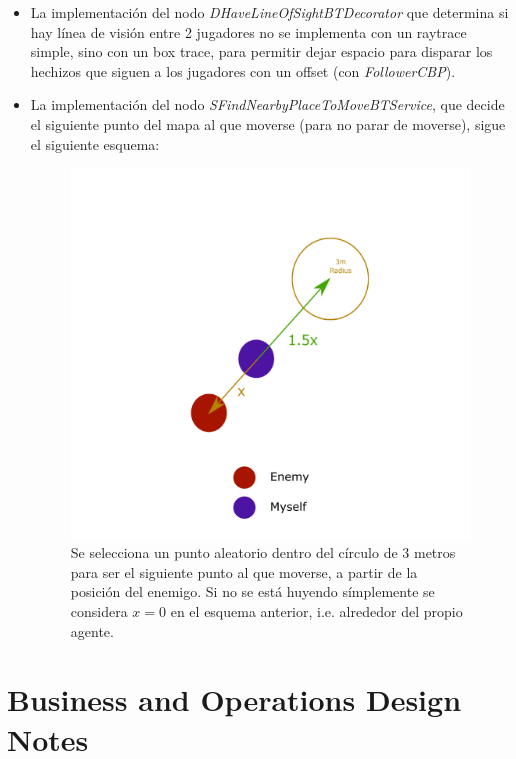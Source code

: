 \documentclass[12pt]{report}
\newcommand*\cleartoleftpage{%
  \clearpage
  \ifodd\value{page}\hbox{}\newpage\fi
}
\begin{document}
\begin{itemize}
	\item La implementación del nodo \textit{\emph{DHaveLineOfSightBTDecorator}} que determina si hay línea de visión entre 2 jugadores no se implementa con un raytrace simple, sino con un box trace, para permitir dejar espacio para disparar los hechizos que siguen a los jugadores con un offset (con \textit{FollowerCBP}).
	\item La implementación del nodo \textit{\emph{SFindNearbyPlaceToMoveBTService}}, que decide el siguiente punto del mapa al que moverse (para no parar de moverse), sigue el siguiente esquema:
	\begin{figure}[H]
	    \centering
	    \includegraphics[width=1\textwidth]{positioning_scheme}
		\captionsetup{labelformat=empty}
	    \caption{Se selecciona un punto aleatorio dentro del círculo de 3 metros para ser el siguiente punto al que moverse, a partir de la posición del enemigo. Si no se está huyendo símplemente se considera $x = 0$ en el esquema anterior, i.e. alrededor del propio agente.}
	\end{figure}
\end{itemize}

\cleartoleftpage

\part{Business and Operations Design Notes}
\end{document}
